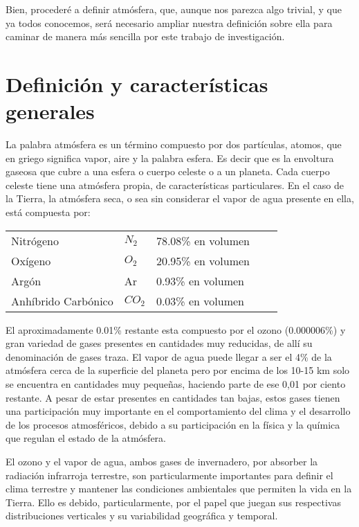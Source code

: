 \documentclass{article}
\begin{document}
\begin{doublespace}
Bien, procederé a definir atmósfera, que, aunque nos parezca algo trivial, y que ya todos conocemos, será necesario ampliar nuestra definición sobre ella para caminar de manera más sencilla por este trabajo de investigación.

\section{Definición y características generales}
La palabra atmósfera es un término compuesto por dos partículas, atomos, que en griego significa vapor, aire y la palabra esfera. Es decir que es la envoltura gaseosa que cubre a una esfera o cuerpo celeste o a un planeta. Cada cuerpo celeste tiene una atmósfera propia, de características particulares. En el caso de la Tierra, la atmósfera seca, o sea sin considerar el vapor de agua presente en ella, está compuesta por:
\begin{table}[h]
\centering
\label{my-label}
\begin{tabular}{|l|l|l|ll}
\cline{1-3}
Nitrógeno           & $N_2$  & 78.08\% en volumen &  &  \\ \cline{1-3}
Oxígeno             & $O_2$  & 20.95\% en volumen &  &  \\ \cline{1-3}
Argón               & Ar     & 0.93\% en volumen  &  &  \\ \cline{1-3}
Anhíbrido Carbónico & $CO_2$ & 0.03\% en volumen  &  &  \\ \cline{1-3}
\end{tabular}
\end{table}

El aproximadamente 0.01\% restante esta compuesto por el ozono (0.000006\%) y gran variedad de gases presentes en cantidades muy reducidas, de allí su denominación de gases traza. El vapor de agua puede llegar a ser el 4\% de la atmósfera cerca de la superficie del planeta pero por encima de los 10-15 km solo se encuentra en cantidades muy pequeñas, haciendo parte de ese 0,01 por ciento restante. A pesar de estar presentes en cantidades tan bajas, estos gases tienen una participación muy importante en el comportamiento del clima y el desarrollo de los procesos atmosféricos, debido a su participación en la física y la química que regulan el estado de la atmósfera.

El ozono y el vapor de agua, ambos gases de invernadero, por absorber la radiación infrarroja terrestre, son particularmente importantes para definir el clima terrestre y mantener las condiciones ambientales que permiten la vida en la Tierra. Ello es debido, particularmente, por el papel que juegan sus respectivas distribuciones verticales y su variabilidad geográfica y temporal.



\end{doublespace}
\end{document}
